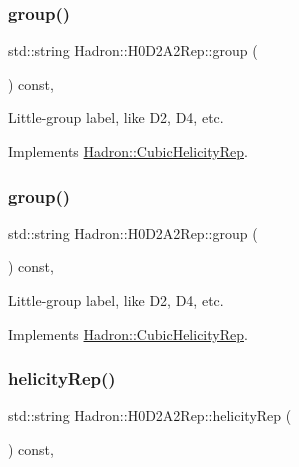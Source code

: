 \subsubsection{\texorpdfstring{group()}{group()}\hspace{0.1cm}{\footnotesize\ttfamily [2/3]}}
{\footnotesize\ttfamily std\+::string Hadron\+::\+H0\+D2\+A2\+Rep\+::group (\begin{DoxyParamCaption}{ }\end{DoxyParamCaption}) const\hspace{0.3cm}{\ttfamily [inline]}, {\ttfamily [virtual]}}

Little-\/group label, like D2, D4, etc. 

Implements \mbox{\hyperlink{structHadron_1_1CubicHelicityRep_a101a7d76cd8ccdad0f272db44b766113}{Hadron\+::\+Cubic\+Helicity\+Rep}}.

\mbox{\label{structHadron_1_1H0D2A2Rep_a447b40e4e175693969a3510643b01f46}} 
\subsubsection{\texorpdfstring{group()}{group()}\hspace{0.1cm}{\footnotesize\ttfamily [3/3]}}
{\footnotesize\ttfamily std\+::string Hadron\+::\+H0\+D2\+A2\+Rep\+::group (\begin{DoxyParamCaption}{ }\end{DoxyParamCaption}) const\hspace{0.3cm}{\ttfamily [inline]}, {\ttfamily [virtual]}}

Little-\/group label, like D2, D4, etc. 

Implements \mbox{\hyperlink{structHadron_1_1CubicHelicityRep_a101a7d76cd8ccdad0f272db44b766113}{Hadron\+::\+Cubic\+Helicity\+Rep}}.

\mbox{\label{structHadron_1_1H0D2A2Rep_aa9316edf57dc396c9ff64b842985aa33}} 
\subsubsection{\texorpdfstring{helicityRep()}{helicityRep()}\hspace{0.1cm}{\footnotesize\ttfamily [1/2]}}
{\footnotesize\ttfamily std\+::string Hadron\+::\+H0\+D2\+A2\+Rep\+::helicity\+Rep (\begin{DoxyParamCaption}{ }\end{DoxyParamCaption}) const\hspace{0.3cm}{\ttfamily [inline]}, {\ttfamily [virtual]}}

